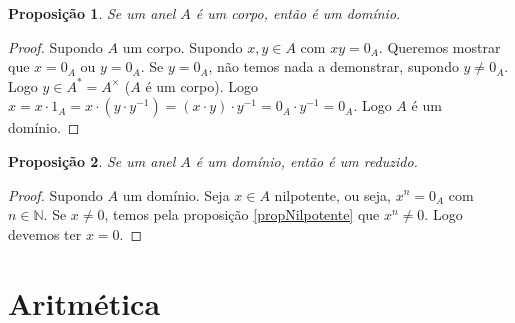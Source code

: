\documentclass{article}
\newtheorem{prop}{Proposição}[section]
\theoremstyle{theorem}
\theoremstyle{lemma}
\theoremstyle{definition}
\theoremstyle{remark}
\begin{document}
\begin{prop}
	Se um anel $A$ é um corpo, então é um domínio.
\end{prop}
\begin{proof}
	Supondo $A$ um corpo. Supondo $x,y\in A$ com $xy = 0_A$. Queremos mostrar que $x =0_A$ ou $y = 0_A$. Se $y = 0_A$, não temos nada a demonstrar, supondo $y\neq 0_A$. Logo $y \in A^{*} = A^{\times}$ ($A$ é um corpo). Logo $x =x\cdot 1_A =  x\cdot (y\cdot y^{-1}) = (x\cdot y)\cdot y^{-1} = 0_A\cdot y^{-1} = 0_A$. Logo $A$ é um domínio.
\end{proof}
\begin{prop}
	Se um anel $A$ é um domínio, então é um reduzido.
\end{prop}
\begin{proof}
	Supondo $A$ um domínio. Seja $x\in A$ nilpotente, ou seja, $x^n = 0_A$ com $n\in \mathbb{N}$. Se $x\neq 0$, temos pela proposição \ref{propNilpotente} que $x^n \neq 0$.  Logo devemos ter $x = 0$.
\end{proof}
\section{Aritmética}
\end{document}
